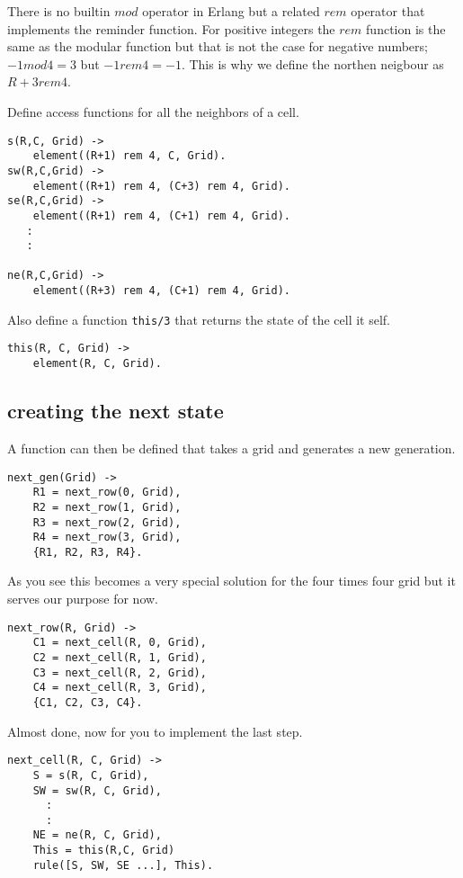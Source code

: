 \documentclass[a4paper,11pt]{article}
\begin{document}
There is no builtin $mod$ operator in Erlang but a related $rem$
operator that implements the reminder function. For positive integers
the $rem$ function is the same as the modular function but that is not
the case for negative numbers; $-1 mod 4 = 3$ but 
$-1 rem 4 = -1$. This is why we define the northen neigbour as $R + 3 rem 4$.

Define access functions for all the neighbors of a cell.

\begin{verbatim}
s(R,C, Grid) ->
    element((R+1) rem 4, C, Grid).
sw(R,C,Grid) ->
    element((R+1) rem 4, (C+3) rem 4, Grid).
se(R,C,Grid) ->
    element((R+1) rem 4, (C+1) rem 4, Grid).    
   :
   :

ne(R,C,Grid) ->
    element((R+3) rem 4, (C+1) rem 4, Grid).    
\end{verbatim}

Also define a function {\tt this/3} that returns the state of the
cell it self.

\begin{verbatim}
this(R, C, Grid) ->
    element(R, C, Grid).
\end{verbatim}

\subsection{creating the next state}

A function can then be defined that takes a grid and generates a new
generation. 

\begin{verbatim}
next_gen(Grid) ->
    R1 = next_row(0, Grid),
    R2 = next_row(1, Grid),
    R3 = next_row(2, Grid),
    R4 = next_row(3, Grid),
    {R1, R2, R3, R4}.
\end{verbatim}

As you see this becomes a very special solution for the four times
four grid but it serves our purpose for now.

\begin{verbatim}
next_row(R, Grid) ->
    C1 = next_cell(R, 0, Grid),
    C2 = next_cell(R, 1, Grid),
    C3 = next_cell(R, 2, Grid),
    C4 = next_cell(R, 3, Grid),
    {C1, C2, C3, C4}.
\end{verbatim}

Almost done, now for you to implement the last step.

\begin{verbatim}
next_cell(R, C, Grid) ->
    S = s(R, C, Grid),
    SW = sw(R, C, Grid),
      :
      :
    NE = ne(R, C, Grid),
    This = this(R,C, Grid)
    rule([S, SW, SE ...], This).
\end{verbatim}
\end{document}
